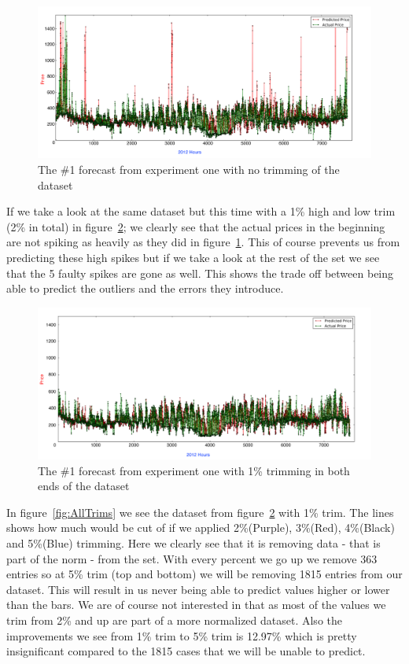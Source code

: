 \begin{figure}[H]
\centering
\includegraphics[width=\linewidth]{billeder/PriceExperimentalAnalysis/NoTrimming.png}
\caption{The \#1 forecast from experiment one with no trimming of the dataset}
\label{fig:NoTrim}
\end{figure}

If we take a look at the same dataset but this time with a 1\% high and low trim (2\% in total) in figure~\ref{fig:1PTrim}; we clearly see that the actual prices in the beginning are not spiking as heavily as they did in figure~\ref{fig:NoTrim}. This of course prevents us from predicting these high spikes but if we take a look at the rest of the set we see that the 5 faulty spikes are gone as well. This shows the trade off between being able to predict the outliers and the errors they introduce.

\begin{figure}[H]
\centering
\includegraphics[width=\linewidth]{billeder/PriceExperimentalAnalysis/1PTrim.png}
\caption{The \#1 forecast from experiment one with 1\% trimming in both ends of the dataset}
\label{fig:1PTrim}
\end{figure}

In figure~\ref{fig:AllTrims} we see the dataset from figure~\ref{fig:1PTrim} with 1\% trim. The lines shows how much would be cut of if we applied 2\%(Purple), 3\%(Red), 4\%(Black) and 5\%(Blue) trimming. Here we clearly see that it is removing data - that is part of the norm - from the set. With every percent we go up we remove 363 entries so at 5\% trim (top and bottom) we will be removing 1815 entries from our dataset. This will result in us never being able to predict values higher or lower than the bars. We are of course not interested in that as most of the values we trim from 2\% and up are part of a more normalized dataset. Also the improvements we see from 1\% trim to 5\% trim is 12.97\% which is pretty insignificant compared to the 1815 cases that we will be unable to predict.

